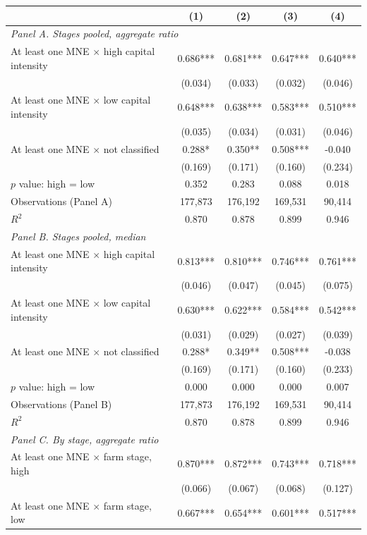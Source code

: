 \begin{tabular}{l*{4}{c}}
\toprule
 & (1) & (2) & (3) & (4) \\
\midrule
\multicolumn{5}{l}{\textit{Panel A. Stages pooled, aggregate ratio}} \\
At least one MNE $\times$ high capital intensity & 0.686*** & 0.681*** & 0.647*** & 0.640*** \\
 & (0.034) & (0.033) & (0.032) & (0.046) \\
At least one MNE $\times$ low capital intensity & 0.648*** & 0.638*** & 0.583*** & 0.510*** \\
 & (0.035) & (0.034) & (0.031) & (0.046) \\
At least one MNE $\times$ not classified & 0.288* & 0.350** & 0.508*** & -0.040 \\
 & (0.169) & (0.171) & (0.160) & (0.234) \\
$p$ value: high = low & 0.352 & 0.283 & 0.088 & 0.018 \\
Observations (Panel A) & 177,873 & 176,192 & 169,531 & 90,414 \\
$R^2$ & 0.870 & 0.878 & 0.899 & 0.946 \\
\midrule
\multicolumn{5}{l}{\textit{Panel B. Stages pooled, median}} \\
At least one MNE $\times$ high capital intensity & 0.813*** & 0.810*** & 0.746*** & 0.761*** \\
 & (0.046) & (0.047) & (0.045) & (0.075) \\
At least one MNE $\times$ low capital intensity & 0.630*** & 0.622*** & 0.584*** & 0.542*** \\
 & (0.031) & (0.029) & (0.027) & (0.039) \\
At least one MNE $\times$ not classified & 0.288* & 0.349** & 0.508*** & -0.038 \\
 & (0.169) & (0.171) & (0.160) & (0.233) \\
$p$ value: high = low & 0.000 & 0.000 & 0.000 & 0.007 \\
Observations (Panel B) & 177,873 & 176,192 & 169,531 & 90,414 \\
$R^2$ & 0.870 & 0.878 & 0.899 & 0.946 \\
\midrule
\multicolumn{5}{l}{\textit{Panel C. By stage, aggregate ratio}} \\
At least one MNE $\times$ farm stage, high & 0.870*** & 0.872*** & 0.743*** & 0.718*** \\
 & (0.066) & (0.067) & (0.068) & (0.127) \\
At least one MNE $\times$ farm stage, low & 0.667*** & 0.654*** & 0.601*** & 0.517*** \\

\end{tabular}
